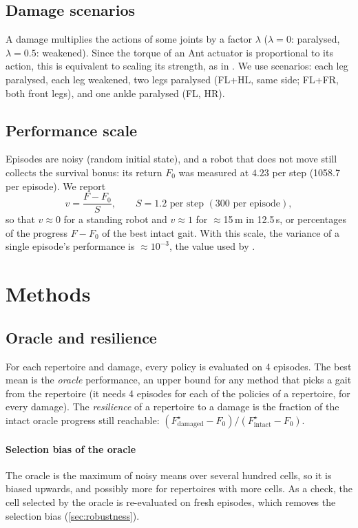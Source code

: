 \documentclass[11pt,a4paper]{article}
\begin{document}
\subsection{Damage scenarios}
A damage multiplies the actions of some joints by a factor $\lambda$ ($\lambda=0$: paralysed, $\lambda=0.5$:
weakened). Since the torque of an Ant actuator is proportional to its action, this is equivalent to scaling its
strength, as in \citet{chalumeau2023neuroevolution}. We use \NScenarios{} scenarios: each leg paralysed, each leg
weakened, two legs paralysed (FL+HL, same side; FL+FR, both front legs), and one ankle paralysed (FL, HR).

\subsection{Performance scale}\label{sec:scale}
Episodes are noisy (random initial state), and a robot that does not move still collects the survival bonus: its
return $F_0$ was measured at $4.23$ per step (1058.7 per episode). We report
\[ v = \frac{F - F_0}{S}, \qquad S = 1.2 \text{ per step } (300 \text{ per episode}), \]
so that $v\approx0$ for a standing robot and $v\approx1$ for $\approx$15\,m in 12.5\,s, or percentages of the
progress $F-F_0$ of the best intact gait. With this scale, the variance of a single episode's performance is
$\approx10^{-3}$, the value used by \citet{cully2015robots}.

\section{Methods}
\subsection{Oracle and resilience}
For each repertoire and damage, every policy is evaluated on 4 episodes. The best mean is the \emph{oracle}
performance, an upper bound for any method that picks a gait from the repertoire (it needs 4 episodes for each of the
\OraclePolicies{} policies of a repertoire, for every damage).
The \emph{resilience} of a repertoire to a damage is the fraction of the intact oracle progress still reachable:
$(F^\star_{\text{damaged}}-F_0)/(F^\star_{\text{intact}}-F_0)$.

\paragraph{Selection bias of the oracle} The oracle is the maximum of noisy means over several hundred cells, so it is
biased upwards, and possibly more for repertoires with more cells. As a check, the cell selected by the oracle is
re-evaluated on \OracleCheckEpisodes{} fresh episodes, which removes the selection bias (\cref{sec:robustness}).
\end{document}
